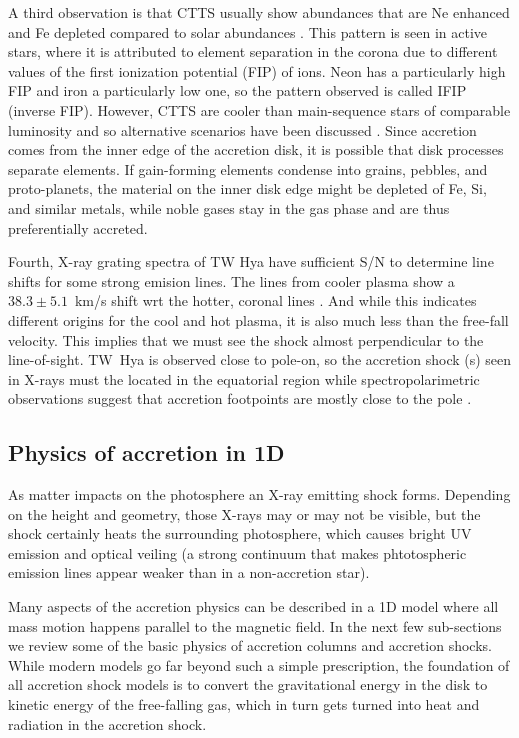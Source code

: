 A third observation is that CTTS usually show abundances that are Ne enhanced and Fe depleted compared to solar abundances \citep{Stelzer_2004}. This pattern is seen in active stars, where it is attributed to element separation in the corona due to different values of the first ionization potential (FIP) of ions. Neon has a particularly high FIP and iron a particularly low one, so the pattern observed is called IFIP (inverse FIP). However, CTTS are cooler than main-sequence stars of comparable luminosity and so alternative scenarios have been discussed \citep{Drake_2005}. Since accretion comes from the inner edge of the accretion disk, it is possible that disk processes separate elements. If gain-forming elements condense into grains, pebbles, and proto-planets, the material on the inner disk edge might be depleted of Fe, Si, and similar metals, while noble gases stay in the gas phase and are thus preferentially accreted. 

Fourth, X-ray grating spectra of TW Hya have sufficient S/N to determine  line shifts for some strong emision lines. The lines from cooler plasma show a $38.3 \pm 5.1$~km/s shift wrt the hotter, coronal lines \cite{2017A&A...607A..14A}. And while this indicates different origins for the cool and hot plasma, it is also much less than the free-fall velocity. This implies that we must see the shock almost perpendicular to the line-of-sight. TW~Hya is observed close to pole-on, so the accretion shock (s) seen in X-rays must the located in the equatorial region while spectropolarimetric observations suggest that accretion footpoints are mostly close to the pole \cite{Donati_2011}.


\subsection{Physics of accretion in 1D}
\label{sect:accretionphysics}
As matter impacts on the photosphere an X-ray emitting shock forms. Depending on the height and geometry, those X-rays may or may not be visible, but the shock certainly heats the surrounding photosphere, which causes bright UV emission and optical veiling (a strong continuum that makes phtotospheric emission lines appear weaker than in a non-accretion star).

Many aspects of the accretion physics can be described in a 1D model where all mass motion happens parallel to the magnetic field. In the next few sub-sections we review some of the basic physics of accretion columns and accretion shocks. While modern models go far beyond such a simple prescription, the foundation of all accretion shock models is to convert the gravitational energy in the disk to kinetic energy of the free-falling gas, which in turn gets turned into heat and radiation in the accretion shock.

